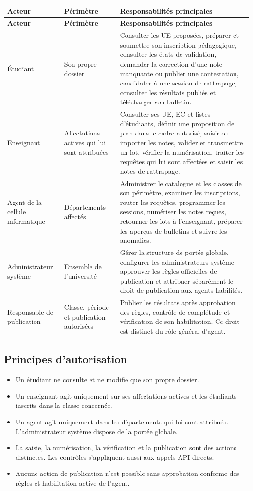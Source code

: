 \documentclass[11pt,a4paper]{article}
\begin{document}
\begin{longtable}{L{3.0cm}L{4.0cm}L{8.3cm}}
\toprule
\textbf{Acteur} & \textbf{Périmètre} & \textbf{Responsabilités principales} \\
\midrule
\endfirsthead
\toprule
\textbf{Acteur} & \textbf{Périmètre} & \textbf{Responsabilités principales} \\
\midrule
\endhead
Étudiant & Son propre dossier & Consulter les UE proposées, préparer et soumettre son inscription pédagogique, consulter les états de validation, demander la correction d'une note manquante ou publier une contestation, candidater à une session de rattrapage, consulter les résultats publiés et télécharger son bulletin. \\
Enseignant & Affectations actives qui lui sont attribuées & Consulter ses UE, EC et listes d'étudiants, définir une proposition de plan dans le cadre autorisé, saisir ou importer les notes, valider et transmettre un lot, vérifier la numérisation, traiter les requêtes qui lui sont affectées et saisir les notes de rattrapage. \\
Agent de la cellule informatique & Départements affectés & Administrer le catalogue et les classes de son périmètre, examiner les inscriptions, router les requêtes, programmer les sessions, numériser les notes reçues, retourner les lots à l'enseignant, préparer les aperçus de bulletins et suivre les anomalies. \\
Administrateur système & Ensemble de l'université & Gérer la structure de portée globale, configurer les administrateurs système, approuver les règles officielles de publication et attribuer séparément le droit de publication aux agents habilités. \\
Responsable de publication & Classe, période et publication autorisées & Publier les résultats après approbation des règles, contrôle de complétude et vérification de son habilitation. Ce droit est distinct du rôle général d'agent. \\
\bottomrule
\end{longtable}

\subsection{Principes d'autorisation}
\begin{itemize}
  \item Un étudiant ne consulte et ne modifie que son propre dossier.
  \item Un enseignant agit uniquement sur ses affectations actives et les étudiants inscrits dans la classe concernée.
  \item Un agent agit uniquement dans les départements qui lui sont attribués. L'administrateur système dispose de la portée globale.
  \item La saisie, la numérisation, la vérification et la publication sont des actions distinctes. Les contrôles s'appliquent aussi aux appels API directs.
  \item Aucune action de publication n'est possible sans approbation conforme des règles et habilitation active de l'agent.
\end{itemize}
\end{document}
